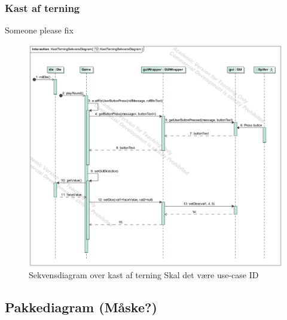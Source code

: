 \documentclass[../main.tex]{subfiles}
\begin{document}
\begin{flushleft}
\subsubsection{Kast af terning}
\TODO Someone please fix
\begin{figure}[H]
    \centering
    \includegraphics[width=0.7\linewidth]{figures/sekvensDiagrammer/KastTerningSekvensDiagram.png}
    \caption{Sekvensdiagram over kast af terning \TODO Skal det være use-case ID}
    \label{fig:sekvensKastTerning}
\end{figure}

\subsection{Pakkediagram (Måske?) }

\end{flushleft}
\end{document}
